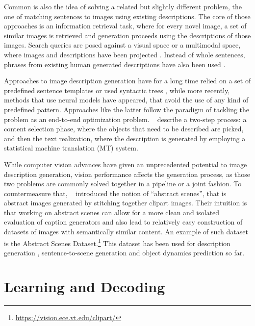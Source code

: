 \documentclass[letterpaper]{article}
\newcommand{\newcite}[1]{\citeauthor{#1}~\shortcite{#1}}
\begin{document}
Common is also the idea of solving a related but slightly different problem, the one of matching sentences to images using existing descriptions.
The core of those approaches is an information retrieval task, where for every novel image, a set of similar images is retrieved and generation proceeds
using the descriptions of those images. Search queries are posed against a visual space \cite{ordonez2011im2text,mason2014nonparametric} or a multimodal space, where
images and descriptions have been projected \cite{farhadi2010every,hodosh2013framing}. Instead of whole sentences, phrases from existing human generated descriptions
have also been used \cite{kuznetsova2012collective}.

Approaches to image description generation have for a long time relied on a set of predefined sentence templates
\cite{kulkarni2011baby,elliott2013image,yang2011corpus} or used syntactic trees \cite{mitchell2012midge}, while more recently,
methods that use neural models \cite{kiros2014multimodal,vinyals2015show} have appeared, that avoid the use of any kind of predefined pattern.
Approaches like the latter follow the paradigm of tackling the problem as an end-to-end optimization problem.
\newcite{ortiz2015learning} describe a two-step process: a content selection phase, where the objects that need to
be described are picked, and then the text realization, where the description is generated
by employing a statistical machine translation (MT) system.


While computer vision advances have given an unprecedented potential to image description generation, vision performance affects
the generation process, as those two problems are commonly solved together in a pipeline or a joint fashion.
To countermeasure that, \newcite{zitnick2013bringing} introduced the notion of ``abstract scenes'', that is abstract images generated
by stitching together clipart images. Their intuition is that working on abstract scenes can allow for a more clean and isolated evaluation
of caption generators and also lead to relatively easy construction of datasets of images with semantically similar content.
An example of such dataset is the Abstract Scenes Dataset.\footnote{\url{https://vision.ece.vt.edu/clipart/}}
This dataset has been used for description generation \cite{ortiz2015learning}, sentence-to-scene generation \cite{zitnick2013learning} and
object dynamics prediction \cite{fouhey2014predicting} so far.

\section{Learning and Decoding}
\label{section:cca-infer}
\end{document}
